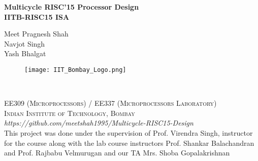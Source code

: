 \documentclass[11pt,fleqn,oneside]{book} %
\begin{document}

\begingroup
\thispagestyle{empty}
\centering
\vspace*{5cm}
\par\normalfont\fontsize{35}{35}\sffamily\selectfont
\textbf{Multicycle RISC'15 Processor Design}\\
{\LARGE \textbf{IITB-RISC15 ISA} }\par %
\vspace*{1cm}
{\Huge Meet Pragnesh Shah \\ Navjot Singh \\ Yash Bhalgat}\par %
\endgroup


\newpage

\begin{figure}[h]
    \centering
    \texttt{[image: IIT\_Bombay\_Logo.png]}
    \end{figure}
    
~\vfill
\thispagestyle{empty}



\noindent \textsc{EE309 (Microprocessors) / EE337 (Microprocessors Laboratory)}\\

\noindent \textsc{Indian Institute of Technology, Bombay}\\

\noindent \textit{https://github.com/meetshah1995/Multicycle-RISC15-Design}\\

\noindent This project was done under the supervision of Prof. Virendra Singh, instructor for the course along with the lab course instructors Prof. Shankar Balachandran and Prof. Rajbabu Velmurugan and our TA Mrs. Shoba Gopalakrishnan \\ %

\end{document}
